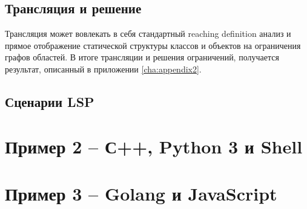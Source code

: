 \subsection{Трансляция и решение}

Трансляция может вовлекать в себя стандартный reaching definition анализ \cite{static-program-analysis} и прямое отображение
статической структуры классов и объектов на ограничения графов областей. В итоге трансляции и решения ограничений, получается
результат, описанный в приложении \ref{cha:appendix2}.

\subsection{Сценарии LSP}



\section{Пример 2 -- С++, Python 3 и Shell}

\section{Пример 3 -- Golang и JavaScript}

\clearpage